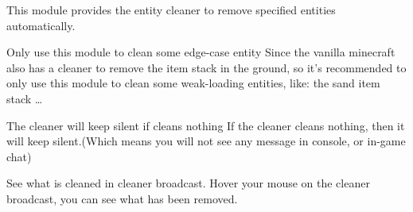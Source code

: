 \label{ch:cleaner}

This module provides the entity cleaner to remove specified entities automatically.

\begin{note}{Only use this module to clean some edge-case entity}
    Since the vanilla minecraft also has a cleaner to remove the item stack in the ground, so it's recommended to only use this module to clean some weak-loading entities, like: the sand item stack \ldots
\end{note}


\begin{note}{The cleaner will keep silent if cleans nothing}
    If the cleaner cleans nothing, then it will keep silent.(Which means you will not see any message in console, or in-game chat)
\end{note}

\begin{tips}{See what is cleaned in cleaner broadcast.}
    Hover your mouse on the cleaner broadcast, you can see what has been removed.
\end{tips}

